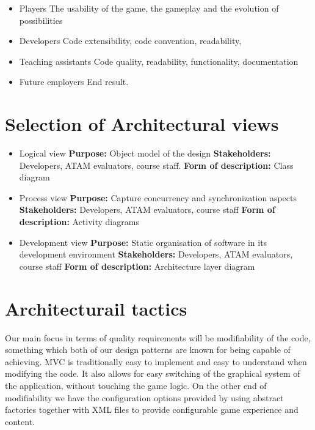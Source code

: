 \documentclass[12pt, a4paper]{article}
\begin{document}
\begin{itemize}
	\item Players
	\subitem The usability of the game, the gameplay and the evolution of possibilities 

	\item Developers
	\subitem Code extensibility, code convention, readability, 

	\item Teaching assistants
	\subitem Code quality, readability, functionality, documentation

	\item Future employers
	\subitem End result. 
\end{itemize}

\section{Selection of Architectural views}

\begin{itemize}
	\item Logical view
	\subitem \textbf{Purpose:} Object model of the design
	\subitem \textbf{Stakeholders:} Developers, ATAM evaluators, course staff.
	\subitem \textbf{Form of description:} Class diagram

	\item Process view
	\subitem \textbf{Purpose:} Capture concurrency and synchronization aspects
	\subitem \textbf{Stakeholders:} Developers, ATAM evaluators, course staff
	\subitem \textbf{Form of description:} Activity diagrams

	\item Development view
	\subitem \textbf{Purpose:} Static organisation of software in its development environment
	\subitem \textbf{Stakeholders:} Developers, ATAM evaluators, course staff
	\subitem \textbf{Form of description:} Architecture layer diagram

\end{itemize}


\section{Architecturail tactics}

Our main focus in terms of quality requirements will be modifiability of the code, something which both of our design patterns are known for being capable of achieving. MVC is traditionally easy to implement and easy to understand when modifying the code. It also allows for easy switching of the graphical system of the application, without touching the game logic. On the other end of modifiability we have the configuration options provided by using abstract factories together with XML files to provide configurable game experience and content.
\end{document}
